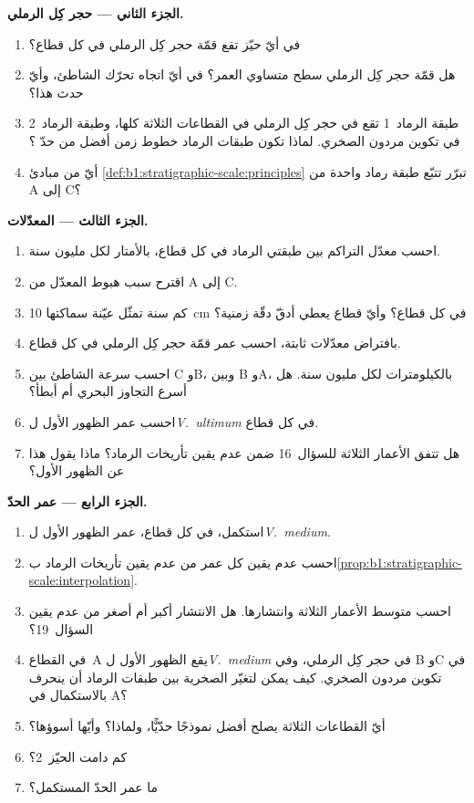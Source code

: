 \begin{problem}
\noindent\textbf{الجزء الثاني --- حجر كِل الرملي.}
\begin{enumerate}[resume]
  \item في أيّ حيّز تقع قمّة حجر كِل الرملي في كل قطاع؟
  \item هل قمّة حجر كِل الرملي سطح متساوي العمر؟ في أيّ اتجاه تحرّك الشاطئ، وأيّ حدث هذا؟
  \item طبقة الرماد~1 تقع في حجر كِل الرملي في القطاعات الثلاثة كلها، وطبقة الرماد~2 في تكوين مردون الصخري. لماذا تكون طبقات الرماد خطوط زمن أفضل من حدّ ؟
  \item أيّ من مبادئ \cref{def:b1:stratigraphic-scale:principles} تبرّر تتبّع طبقة رماد واحدة من A إلى C؟
\end{enumerate}

\noindent\textbf{الجزء الثالث --- المعدّلات.}
\begin{enumerate}[resume]
  \item احسب معدّل التراكم بين طبقتي الرماد في كل قطاع، بالأمتار لكل مليون سنة.
  \item اقترح سبب هبوط المعدّل من A إلى C.
  \item كم سنة تمثّل عيّنة سماكتها \qty{10}{cm} في كل قطاع؟ وأيّ قطاع يعطي أدقّ دقّة زمنية؟
  \item بافتراض معدّلات ثابتة، احسب عمر قمّة حجر كِل الرملي في كل قطاع.
  \item احسب سرعة الشاطئ بين C وB، وبين B وA، بالكيلومترات لكل مليون سنة. هل أسرع التجاوز البحري أم أبطأ؟
  \item احسب عمر الظهور الأول ل\emph{V.~ultimum} في كل قطاع.
  \item هل تتفق الأعمار الثلاثة للسؤال~16 ضمن عدم يقين تأريخات الرماد؟ ماذا يقول هذا عن الظهور الأول؟
\end{enumerate}

\noindent\textbf{الجزء الرابع --- عمر الحدّ.}
\begin{enumerate}[resume]
  \item استكمل، في كل قطاع، عمر الظهور الأول ل\emph{V.~medium}.
  \item احسب عدم يقين كل عمر من عدم يقين تأريخات الرماد ب\cref{prop:b1:stratigraphic-scale:interpolation}.
  \item احسب متوسط الأعمار الثلاثة وانتشارها. هل الانتشار أكبر أم أصغر من عدم يقين السؤال~19؟
  \item في القطاع~A يقع الظهور الأول ل\emph{V.~medium} في حجر كِل الرملي، وفي B وC في تكوين مردون الصخري. كيف يمكن لتغيّر الصخرية بين طبقات الرماد أن ينحرف بالاستكمال في A؟
  \item أيّ القطاعات الثلاثة يصلح أفضل نموذجًا حدّيًّا، ولماذا؟ وأيّها أسوؤها؟
  \item كم دامت الحيّز~2؟
  \item ما عمر الحدّ المستكمل؟
\end{enumerate}
\end{problem}
